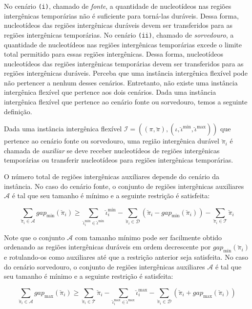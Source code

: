 No cenário \texttt{(i)}, chamado de \emph{fonte}, a quantidade de nucleotídeos nas regiões intergênicas temporárias não é suficiente para torná-las duráveis. Dessa forma, nucleotídeos das regiões intergênicas duráveis devem ser transferidos para as regiões intergênicas temporárias. No cenário \texttt{(ii)}, chamado de \emph{sorvedouro}, a quantidade de nucleotídeos nas regiões intergênicas temporárias excede o limite total permitido para essas regiões intergênicas. Dessa forma, nucleotídeos nucleotídeos das regiões intergênicas temporárias devem ser transferidos para as regiões intergênicas duráveis. Perceba que uma instância intergênica flexível pode não pertencer a nenhum desses cenários. Entretanto, não existe uma instância intergênica flexível que pertence aos dois cenários. Dada uma instância intergênica flexível que pertence ao cenário fonte ou sorvedouro, temos a seguinte definição.

\begin{definition}
  Dada uma instância intergênica flexível $\mathcal{I} = ((\pi,\breve\pi),(\iota,\breve\iota^{\min},\breve\iota^{\max}))$ que pertence ao cenário fonte ou sorvedouro, uma região intergênica durável $\breve\pi_i$ é chamada de \emph{auxiliar} se deve receber nucleotídeos de regiões intergênicas temporárias ou transferir nucleotídeos para regiões intergênicas temporárias. 
\end{definition}

O número total de regiões intergênicas auxiliares depende do cenário da instância. No caso do cenário fonte, o conjunto de regiões intergênicas auxiliares $\mathcal{A}$ é tal que seu tamanho é mínimo e a seguinte restrição é satisfeita:

$$\sum_{\breve\pi_i \in \mathcal{A}} gap_{\min}(\breve\pi_i) \ge \sum_{\breve\iota_{i}^{\min}  \in \breve\iota^{\min}} \breve\iota_{i}^{\min} - \sum_{\breve\pi_i \in \mathcal{D}} (\breve\pi_i - gap_{\min}(\breve\pi_i)) - \sum_{\breve\pi_i \in \mathcal{T}} \breve\pi_i$$

Note que o conjunto $\mathcal{A}$ com tamanho mínimo pode ser facilmente obtido ordenando as regiões intergênicas duráveis em ordem decrescente por $gap_{\min}(\breve\pi_i)$ e rotulando-os como auxiliares até que a restrição anterior seja satisfeita. No caso do cenário sorvedouro, o conjunto de regiões intergênicas auxiliares $\mathcal{A}$ é tal que seu tamanho é mínimo e a seguinte
restrição é satisfeita:

$$\sum_{\breve\pi_i \in \mathcal{A}} gap_{\max}(\breve\pi_i) \ge \sum_{\breve\pi_i \in \mathcal{T}} \breve\pi_i - \sum_{\breve\iota_{i}^{\max}  \in \breve\iota^{\max}} \breve\iota_{i}^{\max} - \sum_{\breve\pi_i \in \mathcal{D}} (\breve\pi_i + gap_{\max}(\breve\pi_i))$$

